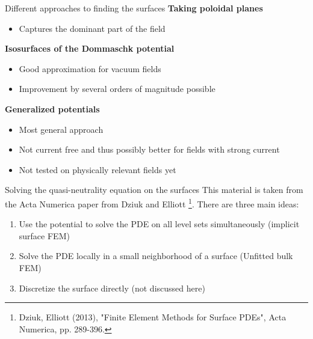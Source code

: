 \documentclass[
	english,%
	logo=false,%
	eurofusion=false, %
	titlegraphic=true, %
	]{ippbeamer}
\begin{document}
\begin{frame}{Different approaches to finding the surfaces}
	\textbf{Taking poloidal planes}
	\begin{itemize}
		\item Captures the dominant part of the field
	\end{itemize}
	\textbf{Isosurfaces of the Dommaschk potential}
	\begin{itemize}
		\item Good approximation for vacuum fields
		\item Improvement by several orders of magnitude possible
	\end{itemize}
	\textbf{Generalized potentials}
	\begin{itemize}
		\item Most general approach
		\item Not current free and thus possibly better for fields with strong current
		\item Not tested on physically relevant fields yet
	\end{itemize}
	
\end{frame}

\begin{frame}{Solving the quasi-neutrality equation on the surfaces}
	This material is taken from the Acta Numerica paper from Dziuk and Elliott
	\footnote{Dziuk, Elliott (2013), "Finite Element Methods for Surface PDEs", 
	Acta Numerica, pp. 289-396.}.
	There are three main ideas: 
	\begin{enumerate}
		\item Use the potential to solve the PDE on all level sets simultaneously 
				(implicit surface FEM)
		\item Solve the PDE locally in a small neighborhood of a surface 
				(Unfitted bulk FEM)
		\item Discretize the surface directly (not discussed here)
	\end{enumerate}
\end{frame}
\end{document}
